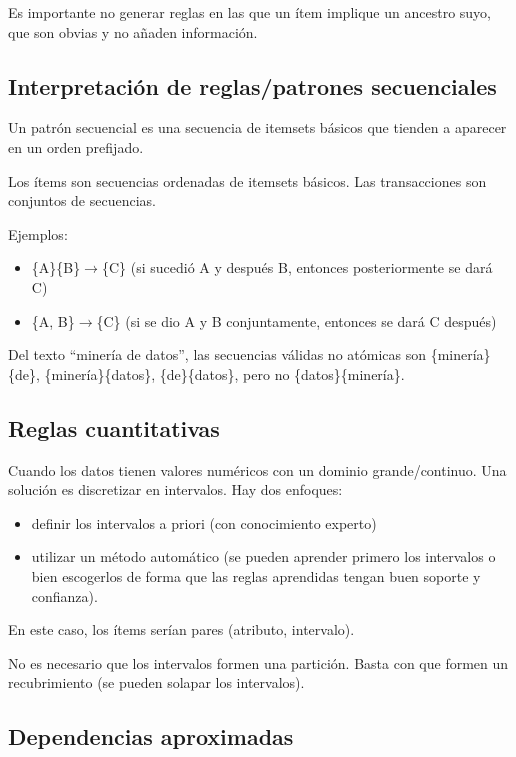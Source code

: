 \documentclass[a4paper,11pt,spanish]{report}
\let\stdsub\subsection
\let\stdsubsub\subsubsection
\renewcommand{\section}{\stdsub}
\renewcommand{\subsection}{\stdsubsub}
\begin{document}
Es importante no generar reglas en las que un ítem implique un ancestro suyo, que son obvias y no añaden información.

\section{Interpretación de reglas/patrones secuenciales}
\label{sec-4-3-5}

Un patrón secuencial es una secuencia de itemsets básicos que tienden a aparecer en un orden prefijado.

Los ítems son secuencias ordenadas de itemsets básicos. Las transacciones son conjuntos de secuencias.

Ejemplos:
\begin{itemize}
\item \{A\}\{B\}$\rightarrow$\{C\} (si sucedió A y después B, entonces posteriormente se dará C)
\item \{A, B\}$\rightarrow$\{C\} (si se dio A y B conjuntamente, entonces se dará C después)
\end{itemize}

Del texto  ``minería de datos'', las secuencias válidas no atómicas son \{minería\}\{de\}, \{minería\}\{datos\}, \{de\}\{datos\}, pero no \{datos\}\{minería\}.

\section{Reglas cuantitativas}
\label{sec-4-3-6}

Cuando los datos tienen valores numéricos con un dominio grande/continuo. Una solución es discretizar en intervalos. Hay dos enfoques:
\begin{itemize}
\item definir los intervalos a priori (con conocimiento experto)
\item utilizar un método automático (se pueden aprender primero los intervalos o bien escogerlos de forma que las reglas aprendidas tengan buen soporte y confianza).
\end{itemize}

En este caso, los ítems serían pares (atributo, intervalo).

No es necesario que los intervalos formen una partición. Basta con que formen un recubrimiento (se pueden solapar los intervalos).

\section{Dependencias aproximadas}
\label{sec-4-3-7}
\end{document}
